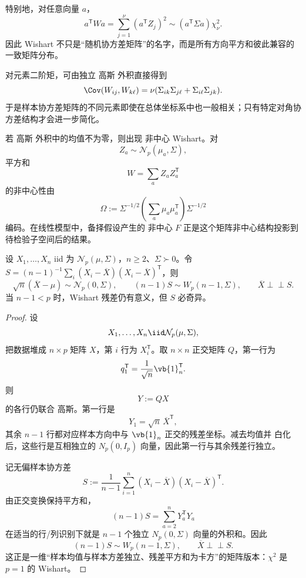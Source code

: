 特别地，对任意向量 $a$，
\[
a^{\mathsf T}Wa
=\sum_{j=1}^{\nu}(a^{\mathsf T}Z_j)^2
\sim
(a^{\mathsf T}\Sigma a)\chi^2_\nu.
\]
因此 Wishart 不只是“随机协方差矩阵”的名字，而是所有方向平方和彼此兼容的一致矩阵分布。

对元素二阶矩，可由独立 高斯 外积直接得到
\begin{equation*}\Cov(W_{ij},W_{k\ell})
=\nu(\Sigma_{ik}\Sigma_{j\ell}+\Sigma_{i\ell}\Sigma_{jk}).\end{equation*}
于是样本协方差矩阵的不同元素即使在总体坐标系中也一般相关；只有特定对角协方差结构才会进一步简化。

若 高斯 外积中的均值不为零，则出现 非中心 Wishart。对
\[
Z_a\sim\mathcal N_p(\mu_a,\Sigma),
\]
平方和
\[
W=\sum_aZ_aZ_a^{\mathsf T}
\]
的非中心性由
\[
\Omega
:=\Sigma^{-1/2}
\left(\sum_a\mu_a\mu_a^{\mathsf T}\right)
\Sigma^{-1/2}
\]
编码。在线性模型中，备择假设产生的 非中心 $F$ 正是这个矩阵非中心结构投影到待检验子空间后的结果。

\begin{theorem}
设 $X_1,\ldots,X_n$ iid 为 $\mathcal N_p(\mu,\Sigma)$，$n\ge2$、$\Sigma\succ0$。令 $S=(n-1)^{-1}\sum_i(X_i-\overline X)(X_i-\overline X)^{\mathsf T}$，则
\[
\sqrt n(\overline X-\mu)\sim\mathcal N_p(0,\Sigma),\qquad
(n-1)S\sim W_p(n-1,\Sigma),\qquad\overline X\perp\!\!\!\perp S.
\]
当 $n-1<p$ 时，Wishart 残差仍有意义，但 $S$ 必奇异。
\end{theorem}
\begin{proof}
设
\[
X_1,\ldots,X_n\iid\mathcal N_p(\mu,\Sigma),
\]
把数据堆成 $n\times p$ 矩阵 $X$，第 $i$ 行为 $X_i^{\mathsf T}$。取 $n\times n$ 正交矩阵 $Q$，第一行为
\[
q_1^{\mathsf T}=\frac1{\sqrt n}\vb{1}_n^{\mathsf T}.
\]
则
\[
Y:=QX
\]
的各行仍联合 高斯。第一行是
\[
Y_1=\sqrt n\,\overline X^{\mathsf T},
\]
其余 $n-1$ 行都对应样本方向中与 $\vb{1}_n$ 正交的残差坐标。减去均值并 白化 后，这些行是互相独立的 $N_p(0,I_p)$ 向量，因此第一行与其余残差行独立。

记无偏样本协方差
\[
S
:=\frac1{n-1}\sum_{i=1}^n
(X_i-\overline X)(X_i-\overline X)^{\mathsf T}.
\]
由正交变换保持平方和，
\[
(n-1)S
=\sum_{a=2}^{n}Y_a^{\mathsf T}Y_a
\]
在适当的行/列识别下就是 $n-1$ 个独立 $N_p(0,\Sigma)$ 向量的外积和。因此
\begin{equation}
{
(n-1)S\sim W_p(n-1,\Sigma),
\qquad
\overline X\perp\!\!\!\perp S.
}
\label{eq:math-stat-normal-mean-wishart-independence}
\end{equation}
这正是一维“样本均值与样本方差独立、残差平方和为卡方”的矩阵版本：$\chi^2$ 是 $p=1$ 的 Wishart。
\end{proof}


